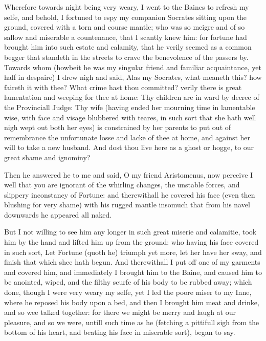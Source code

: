 Wherefore towards night being very weary, I went to the Baines to refresh my
selfe, and behold, I fortuned to espy my companion Socrates sitting upon the
ground, covered with a torn and course mantle; who was so meigre and of so
sallow and miserable a countenance, that I scantly knew him: for fortune had
brought him into such estate and calamity, that he verily seemed as a common
begger that standeth in the streets to crave the benevolence of the passers by.
Towards whom (howbeit he was my singular friend and familiar acquaintance, yet
half in despaire) I drew nigh and said, Alas my Socrates, what meaneth this?
how faireth it with thee? What crime hast thou committed? verily there is great
lamentation and weeping for thee at home: Thy children are in ward by decree of
the Provinciall Judge: Thy wife (having ended her mourning time in lamentable
wise, with face and visage blubbered with teares, in such sort that she hath
well nigh wept out both her eyes) is constrained by her parents to put out of
remembrance the unfortunate losse and lacke of thee at home, and against her
will to take a new husband. And dost thou live here as a ghost or hogge, to our
great shame and ignominy?

Then he answered he to me and said, O my friend Aristomenus, now perceive I
well that you are ignorant of the whirling changes, the unstable forces, and
slippery inconstancy of Fortune: and therewithall he covered his face (even
then blushing for very shame) with his rugged mantle insomuch that from his
navel downwards he appeared all naked.

But I not willing to see him any longer in such great miserie and calamitie,
took him by the hand and lifted him up from the ground: who having his face
covered in such sort, Let Fortune (quoth he) triumph yet more, let her have her
sway, and finish that which shee hath begun. And therewithall I put off one of
my garments and covered him, and immediately I brought him to the Baine, and
caused him to be anointed, wiped, and the filthy scurfe of his body to be
rubbed away; which done, though I were very weary my selfe, yet I led the poore
miser to my Inne, where he reposed his body upon a bed, and then I brought him
meat and drinke, and so wee talked together: for there we might be merry and
laugh at our pleasure, and so we were, untill such time as he (fetching a
pittifull sigh from the bottom of his heart, and beating his face in miserable
sort), began to say.


